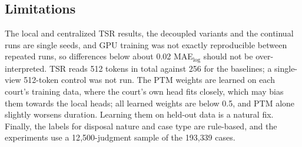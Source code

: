 \subsection{Limitations}
The local and centralized TSR results, the decoupled variants and the continual runs are single seeds, and GPU training was not exactly reproducible between repeated runs, so differences below about 0.02 MAE$_{\log}$ should not be over-interpreted. TSR reads 512 tokens in total against 256 for the baselines; a single-view 512-token control was not run. The PTM weights are learned on each court's training data, where the court's own head fits closely, which may bias them towards the local heads; all learned weights are below 0.5, and PTM alone slightly worsens duration. Learning them on held-out data is a natural fix. Finally, the labels for disposal nature and case type are rule-based, and the experiments use a 12{,}500-judgment sample of the 193{,}339 cases.
